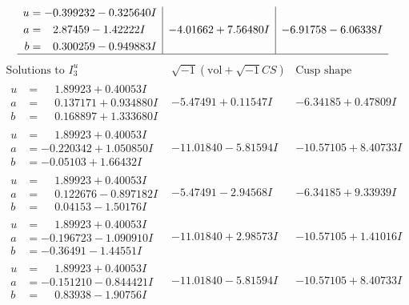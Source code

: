 \documentclass[1p]{elsarticle_modified}
\theoremstyle{definition}
\newcommand{\I}{\sqrt{-1}}
\begin{document}
$$\begin{array}{c|c|c}
\begin{aligned}
u &= -0.399232 - 0.325640 I \\
a &= \phantom{-}2.87459 - 1.42222 I \\
b &= \phantom{-}0.300259 - 0.949883 I\end{aligned}
 & -4.01662 + 7.56480 I & -6.91758 - 6.06338 I\\
 \hline 
 \end{array}$$\newpage$$\begin{array}{c|c|c}  
\text{Solutions to }I^u_{3}& \I (\text{vol} + \sqrt{-1}CS) & \text{Cusp shape}\\
 \hline 
\begin{aligned}
u &= \phantom{-}1.89923 + 0.40053 I \\
a &= \phantom{-}0.137171 + 0.934880 I \\
b &= \phantom{-}0.168897 + 1.333680 I\end{aligned}
 & -5.47491 + 0.11547 I & -6.34185 + 0.47809 I \\ \hline\begin{aligned}
u &= \phantom{-}1.89923 + 0.40053 I \\
a &= -0.220342 + 1.050850 I \\
b &= -0.05103 + 1.66432 I\end{aligned}
 & -11.01840 - 5.81594 I & -10.57105 + 8.40733 I \\ \hline\begin{aligned}
u &= \phantom{-}1.89923 + 0.40053 I \\
a &= \phantom{-}0.122676 - 0.897182 I \\
b &= \phantom{-}0.04153 - 1.50176 I\end{aligned}
 & -5.47491 - 2.94568 I & -6.34185 + 9.33939 I \\ \hline\begin{aligned}
u &= \phantom{-}1.89923 + 0.40053 I \\
a &= -0.196723 - 1.090910 I \\
b &= -0.36491 - 1.44551 I\end{aligned}
 & -11.01840 + 2.98573 I & -10.57105 + 1.41016 I \\ \hline\begin{aligned}
u &= \phantom{-}1.89923 + 0.40053 I \\
a &= -0.151210 - 0.844421 I \\
b &= \phantom{-}0.83938 - 1.90756 I\end{aligned}
 & -11.01840 - 5.81594 I & -10.57105 + 8.40733 I \\ \hline\begin{aligned}

\end{aligned}
\end{array}$$
\end{document}
